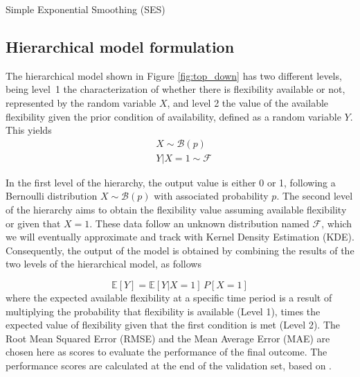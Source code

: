 \begin{algorithm}
	\SetAlgoLined
	\caption{Simple Exponential Smoothing (SES)}
	\label{alg:SES}
\end{algorithm}


\subsection{Hierarchical model formulation}
The hierarchical model shown in Figure \ref{fig:top_down} has two different levels, being level~1 the characterization of whether there is flexibility available or not, represented by the random variable $X$, and level 2 the value of the available flexibility given the prior condition of availability, defined as a random variable $Y$. This yields
\begin{subequations}
\begin{align} 
\label{eq:hierarchicalpierre}
  & X \sim \mathcal{B}(p) \\
  & Y|X=1 \sim \mathcal{F}
\end{align}
\end{subequations}

In the first level of the hierarchy, the output value is either 0 or 1, following a Bernoulli distribution $X \sim \mathcal{B}(p)$ with associated probability $p$. The second level of the hierarchy aims to obtain the flexibility value assuming available flexibility or given that $X=1$. These data follow an unknown distribution named $\mathcal{F}$, which we will eventually approximate and track with Kernel Density Estimation (KDE). Consequently, the output of the model is obtained by combining the results of the two levels of the hierarchical model, as follows

\begin{equation} \label{eq:bernoulli}
  \mathbb{E}[Y] = \mathbb{E}[Y|X=1] \,  P[X=1]
\end{equation}
where the expected available flexibility at a specific time period is a result of multiplying the probability that flexibility is available (Level 1), times the expected value of flexibility given that the first condition is met (Level 2). The Root Mean Squared Error (RMSE) and the Mean Average Error (MAE) are chosen here as scores to evaluate the performance of the final outcome. The performance scores are calculated  at the end of the validation set, based on \cite{Hyndman2021}.


